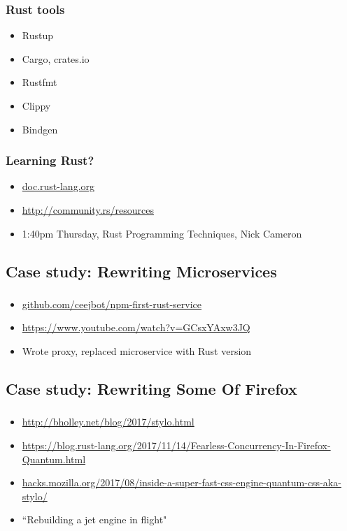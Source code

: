 \documentclass{beamer}
\begin{document}
\begin{frame}[fragile]
\frametitle{Rust tools}
\begin{itemize}
\item Rustup
\item Cargo, crates.io
\item Rustfmt
\item Clippy
\item Bindgen
\end{itemize}
\end{frame}

\begin{frame}[fragile]
\frametitle{Learning Rust?}
\begin{itemize}
\item \url{doc.rust-lang.org}
\item \url{http://community.rs/resources}
\item 1:40pm Thursday, Rust Programming Techniques, Nick Cameron
\end{itemize}
\end{frame}

\subsection{Case study: Rewriting Microservices}

\begin{frame}[fragile]
\frametitle{\insertsubsectionhead}
\begin{itemize}
\item \url{github.com/ceejbot/npm-first-rust-service}
\item \url{https://www.youtube.com/watch?v=GCsxYAxw3JQ}
\item Wrote proxy, replaced microservice with Rust version
\end{itemize}
\end{frame}

\subsection{Case study: Rewriting Some Of Firefox}

\begin{frame}[fragile]
\frametitle{\insertsubsectionhead}
\begin{itemize}
\item \url{http://bholley.net/blog/2017/stylo.html}
\item \url{https://blog.rust-lang.org/2017/11/14/Fearless-Concurrency-In-Firefox-Quantum.html}
\item \url{hacks.mozilla.org/2017/08/inside-a-super-fast-css-engine-quantum-css-aka-stylo/}
\item ``Rebuilding a jet engine in flight"
\end{itemize}
\end{frame}
\end{document}
